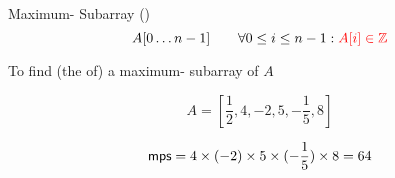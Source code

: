 \begin{frame}{}
  \begin{exampleblock}{Maximum- Subarray (\mps)}
    \[
      A[0 \ldots n-1] \qquad \forall 0 \le i \le n-1: \textcolor{red}{A[i] \in \mathbb{Z}}
    \]

    \begin{center}
      To find (the  of) a maximum- subarray of $A$
    \end{center}
  \end{exampleblock}

  \pause
  \vspace{0.30cm}
  \[
    A = [\frac{1}{2}, 4, -2, 5, -\frac{1}{5}, 8]
  \]

  \pause
  \[
    \textsf{mps} = 4 \times (-2) \times 5 \times (-\frac{1}{5}) \times 8 = 64
  \]
\end{frame}

\begin{frame}{}
\end{frame}

% 
% 
% 
% 

